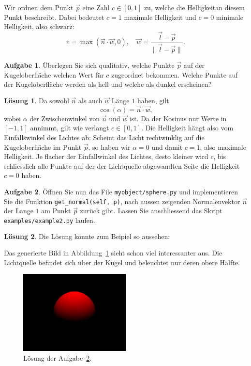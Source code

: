 \documentclass[12pt,a4paper]{article}
\theoremstyle{definition}
\newtheorem{aufgabe}{Aufgabe}
\theoremstyle{definition}
\newtheorem*{losung*}{Lösung}
\begin{document}
Wir ordnen dem Punkt $\vec{p}$ eine Zahl $c\in\left[0,1\right]$ zu, welche die \glqq Helligkeit\grqq an diesem Punkt beschreibt.
Dabei bedeutet $c=1$ maximale Helligkeit und $c=0$ minimale Helligkeit, also schwarz:
\begin{equation}\label{eq:diffuse_coefficient}
	c=\max\left(\vec{n}\cdot\vec{w}, 0\right),\quad
	\vec{w}=\frac{\vec{l}-\vec{p}}{\lVert\vec{l}-\vec{p}\rVert}.
\end{equation}
\begin{aufgabe}\label{aufg:diffuse_coefficient}
	Überlegen Sie sich qualitativ, welche Punkte $\vec{p}$ auf der Kugeloberfläche welchen Wert für $c$ zugeordnet bekommen.
	Welche Punkte auf der Kugeloberfläche werden als \glqq hell\grqq{} und welche als \glqq dunkel\grqq{} erscheinen?
\end{aufgabe}
\begin{losung*}
	Da sowohl $\vec{n}$ als auch $\vec{w}$ Länge $1$ haben, gilt
	\begin{equation*}
		\cos\left(\alpha\right)=\vec{n}\cdot\vec{w},
	\end{equation*}
	wobei $\alpha$ der Zwischenwinkel von $\vec{n}$ und $\vec{w}$ ist.
	Da der Kosinus nur Werte in $\left[-1,1\right]$ annimmt, gilt wie verlangt $c\in\left[0,1\right]$.
	Die Helligkeit hängt also vom Einfallswinkel des Lichtes ab:
	Scheint das Licht rechtwinklig auf die Kugeloberfläche im Punkt $\vec{p}$, so haben wir $\alpha=0$ und damit $c=1$, also maximale Helligkeit.
	Je flacher der Einfallwinkel des Lichtes, desto kleiner wird $c$, bis schliesslich alle  Punkte auf der der Lichtquelle abgewandten Seite die Helligkeit $c=0$ haben.
\end{losung*}
\begin{aufgabe}\label{aufg:diffuse_implementation}
	Öffnen Sie nun das File \texttt{myobject/sphere.py} und implementieren Sie die Funktion \texttt{get\_normal(self, p)}, nach aussen zeigenden Normalenvektor $\vec{n}$ der Lange $1$ am Punkt $\vec{p}$ zurück gibt.
	Lassen Sie anschliessend das Skript \texttt{examples/example2.py} laufen.
\end{aufgabe}
\begin{losung*}
	Die Lösung könnte zum Beipiel so aussehen:
	
	Das generierte Bild in Abbildung~\ref{fig:solution_diffuse} sieht schon viel interessanter aus.
	Die Lichtquelle befindet sich über der Kugel und beleuchtet nur deren obere Hälfte.
	\begin{figure}[ht]
		\centering
		\includegraphics[width=0.5\textwidth]{images/example2.png}
		\caption{Lösung der Aufgabe~\ref{aufg:diffuse_implementation}.}
		\label{fig:solution_diffuse}
	\end{figure}
\end{losung*}
\end{document}
